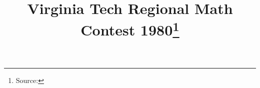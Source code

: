 \documentclass[10pt]{article}
\begin{document}
\title{Virginia Tech Regional Math Contest 1980\footnote{Source: \source}}
\author{\vspace{-2ex}}
\date{\vspace{-6ex}} %
\maketitle








\end{document}
